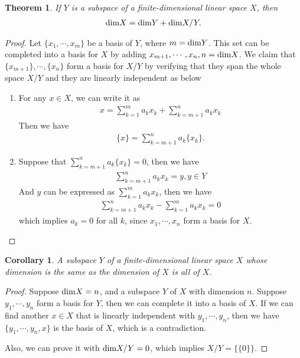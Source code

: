 \documentclass[11pt]{book}
\newtheorem{theorem}{Theorem}[section]
\newtheorem{corollary}{Corollary}[section]
\theoremstyle{definition}
\numberwithin{equation}{subsection}
\begin{document}
\medskip

\begin{theorem}\label{theorem_quotient_dim}
If $Y$ is a subspace of a finite-dimensional linear space $X$, then
\begin{align*}
    {\rm dim}X = {\rm dim}Y + {\rm dim}X/Y.
\end{align*}
\end{theorem}
\begin{proof}
Let $\{x_1, \cdots, x_m\}$ be a basis of $Y$, where $m = {\rm dim}Y$. This set can be completed into a basis for $X$ by adding $x_{m+1}, \cdots, x_n, n = {\rm dim}X$. We claim that $\{x_{m+1}\}, \cdots, \{x_n\}$ form a basis for $X/Y$ by  verifying that they span the whole space $X/Y$ and they are linearly independent as below
\begin{enumerate}[label=(\arabic*)]
    \item For any $x\in X$, we can write it as 
    \begin{align*}
        x = \sum^m_{k=1}a_k x_k + \sum^{n}_{k=m+1}a_k x_k
    \end{align*}
    Then we have 
    \begin{align*}
        \{x\} = \sum^{n}_{k=m+1}a_k \{x_k\}.
    \end{align*}
    \item Suppose that $\sum^{n}_{k=m+1}a_k \{x_k\} = 0$, then we have 
    \begin{align*}
        \sum^{n}_{k=m+1}a_k x_k = y, y\in Y
    \end{align*}
    And $y$ can be expressed as $\sum^{m}_{k=1}a_k x_k$, then we have 
    \begin{align*}
        \sum^{n}_{k=m+1}a_k x_k - \sum^{m}_{k=1}a_k x_k = 0
    \end{align*}
    which implies $a_k = 0$ for all $k$, since $x_1, \cdots, x_n$ form a basis for $X$.
\end{enumerate}
\end{proof}

\begin{corollary}
A subspace $Y$ of a finite-dimensional linear space $X$ whose dimension is the same as the dimension of $X$ is all of $X$.
\end{corollary}
\begin{proof}
Suppose ${\rm dim}X = n$, and a subspace $Y$ of $X$ with dimension $n$. Suppose $y_1,\cdots,y_n$ form a basis for $Y$, then we can complete it into a basis of $X$. If we can find another $x\in X$ that is linearly independent with $y_1,\cdots,y_n$, then we have $\{y_1,\cdots,y_n, x\}$ is the basis of $X$, which is a contradiction. 

Also, we can prove it with ${\rm dim}X/Y = 0$, which implies $X/Y = \{\{0\}\}$.
\end{proof}
\end{document}
